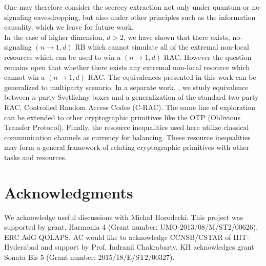 \documentclass[%
 reprint,
 amsmath,amssymb,
 aps,
]{revtex4-1}
\begin{document}

One may therefore
consider the secrecy extraction not only under quantum or no-signaling eavesdropping, but also under other principles such as the information causality, which
we leave for future work.\\      
In the case of higher dimension, $d>2$, we have shown that there exists, no-signaling $(n\rightarrow1,d)$ RB which cannot simulate all of the extremal non-local resources which can be used to win a $(n\rightarrow1,d)$ RAC. However the question remains open that whether there exists any extremal non-local resource which cannot win a $(n\rightarrow1,d)$ RAC. 
The equivalences presented in this work can be generalized to multiparty scenario. In a separate work, \cite{A70747}, we study equivalence between $n$-party Svetlichny boxes and a generalization of the standard two party RAC, Controlled Random Access Codes (C-RAC). The same line of exploration can be extended to other cryptographic primitives like the OTP (Oblivious Transfer Protocol).
Finally, the resource inequalities used here utilize classical communication channels as currency for balancing. These resource inequalities may form a general framework of relating cryptographic primitives with other tasks and resources. 
 
\section{Acknowledgments}
We acknowledge useful discussions with Micha{\l} Horodecki.
This project was supported by grant, Harmonia 4 (Grant number: UMO-2013/08/M/ST2/00626), ERC AdG QOLAPS. AC would like to acknowledge CCNSB/CSTAR of IIIT-Hyderabad and  support by Prof. Indranil Chakrabarty. KH acknowledges grant Sonata Bis 5 (Grant number: 2015/18/E/ST2/00327).

\clearpage

\end{document}

